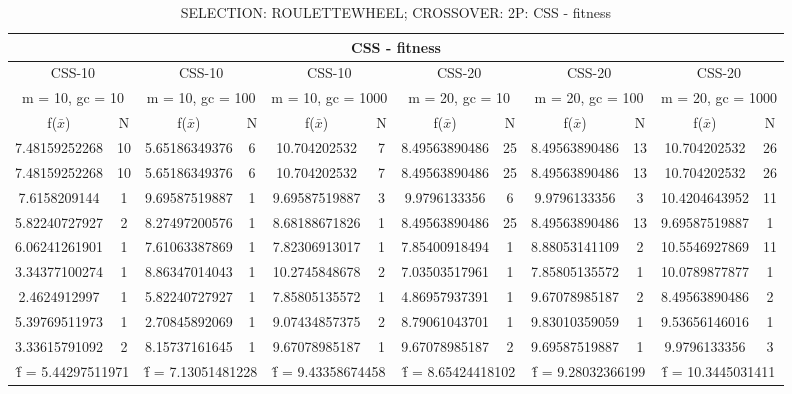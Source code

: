 \begin{table}[H]
	\centering
	\caption{SELECTION: ROULETTEWHEEL; CROSSOVER: 2P: CSS - fitness}
	\begin{adjustbox}{width=1\textwidth}
		\begin{tabular}{ |c|c||c|c||c|c||c|c||c|c||c|c| }
			\hline
			\multicolumn{12}{|c|}{CSS - fitness} \\
			\hline
			\multicolumn{2}{|c||}{CSS-10} & \multicolumn{2}{c||}{CSS-10} & \multicolumn{2}{c||}{CSS-10} & \multicolumn{2}{c||}{CSS-20} & \multicolumn{2}{c||}{CSS-20} & \multicolumn{2}{c|}{CSS-20}\\
			\hline
			\multicolumn{2}{|c||}{m = 10, gc = 10} & \multicolumn{2}{c||}{m = 10, gc = 100} & \multicolumn{2}{c||}{m = 10, gc = 1000} & \multicolumn{2}{c||}{m = 20, gc = 10} & \multicolumn{2}{c||}{m = 20, gc = 100} & \multicolumn{2}{c|}{m = 20, gc = 1000}\\
			\hline
			f($\bar{x}$) & N & f($\bar{x}$) & N & f($\bar{x}$) & N & f($\bar{x}$) & N & f($\bar{x}$) & N & f($\bar{x}$) & N\\
			\hline
			\hline
			7.48159252268 & 10 & 5.65186349376 & 6 & 10.704202532 & 7 & 8.49563890486 & 25 & 8.49563890486 & 13 & 10.704202532 & 26\\
			\hline
			7.48159252268 & 10 & 5.65186349376 & 6 & 10.704202532 & 7 & 8.49563890486 & 25 & 8.49563890486 & 13 & 10.704202532 & 26\\
			7.6158209144 & 1 & 9.69587519887 & 1 & 9.69587519887 & 3 & 9.9796133356 & 6 & 9.9796133356 & 3 & 10.4204643952 & 11\\
			5.82240727927 & 2 & 8.27497200576 & 1 & 8.68188671826 & 1 & 8.49563890486 & 25 & 8.49563890486 & 13 & 9.69587519887 & 1\\
			6.06241261901 & 1 & 7.61063387869 & 1 & 7.82306913017 & 1 & 7.85400918494 & 1 & 8.88053141109 & 2 & 10.5546927869 & 11\\
			3.34377100274 & 1 & 8.86347014043 & 1 & 10.2745848678 & 2 & 7.03503517961 & 1 & 7.85805135572 & 1 & 10.0789877877 & 1\\
			2.4624912997 & 1 & 5.82240727927 & 1 & 7.85805135572 & 1 & 4.86957937391 & 1 & 9.67078985187 & 2 & 8.49563890486 & 2\\
			5.39769511973 & 1 & 2.70845892069 & 1 & 9.07434857375 & 2 & 8.79061043701 & 1 & 9.83010359059 & 1 & 9.53656146016 & 1\\
			3.33615791092 & 2 & 8.15737161645 & 1 & 9.67078985187 & 1 & 9.67078985187 & 2 & 9.69587519887 & 1 & 9.9796133356 & 3\\
			\hline
			\multicolumn{2}{|c||}{\^{f} = 5.44297511971} & \multicolumn{2}{c||}{\^{f} = 7.13051481228} & \multicolumn{2}{c||}{\^{f} = 9.43358674458} & \multicolumn{2}{c||}{\^{f} = 8.65424418102} & \multicolumn{2}{c||}{\^{f} = 9.28032366199} & \multicolumn{2}{c|}{\^{f} = 10.3445031411}\\
			\hline
		\end{tabular}
	\end{adjustbox}
\end{table}
